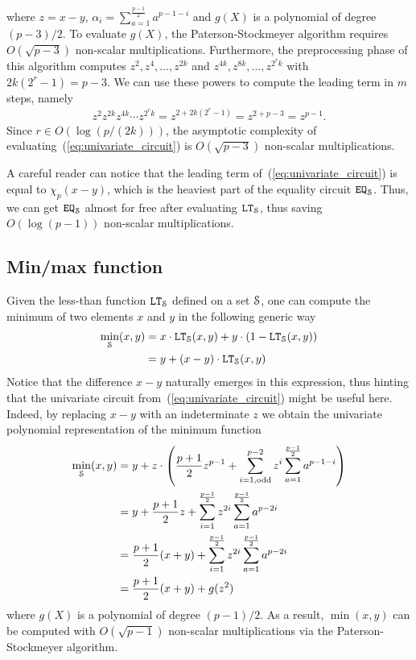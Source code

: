   where $z = x - y$, $\alpha_i = \sum_{a=1}^{\frac{p-1}{2}} a^{p-1-i}$ and $g(X)$ is a polynomial of degree $(p-3)/2$.
  To evaluate $g(X)$, the Paterson-Stockmeyer algorithm requires $O(\sqrt{p-3})$ non-scalar multiplications.
  Furthermore, the preprocessing phase of this algorithm computes $z^2, z^4, \dots, z^{2k}$ and $z^{4k}, z^{8k}, \dots, z^{2^r k}$ with $2k(2^r-1) = p-3$.
  We can use these powers to compute the leading term in $m$ steps, namely
  \begin{align*}
    z^2 z^{2k} z^{4k} \cdots z^{2^r k} = z^{2 + 2k(2^r-1)} = z^{2 + p - 3} = z^{p-1}.
  \end{align*}
  Since $r \in O(\log (p/(2k)))$, the asymptotic complexity of evaluating~(\ref{eq:univariate_circuit}) is $O(\sqrt{p-3})$ non-scalar multiplications.
  
  \begin{remark}
    A careful reader can notice that the leading term of~(\ref{eq:univariate_circuit}) is equal to $\chi_p(x-y)$, which is the heaviest part of the equality circuit $\EQ_\S$.
    Thus, we can get $\EQ_\S$ almost for free after evaluating $\LT_\S$, thus saving $O(\log (p-1))$ non-scalar multiplications.
  \end{remark}

\subsection{Min/max function}

  Given the less-than function $\LT_\S$ defined on a set $\S$, one can compute the minimum of two elements $x$ and $y$ in the following generic way
  \begin{align*}
    \min_\S(x,y) &= x \cdot \LT_\S(x,y) + y \cdot (1 - \LT_\S(x,y)) \\
    &= y + (x-y) \cdot \LT_\S(x,y)
  \end{align*}
  Notice that the difference $x - y$ naturally emerges in this expression, thus hinting that the univariate circuit from~(\ref{eq:univariate_circuit}) might be useful here.
  Indeed, by replacing $x - y$ with an indeterminate $z$ we obtain the univariate polynomial representation of the minimum function 
  \begin{align*}
    \min_\S(x,y) & = y + z \cdot \left(\frac{p+1}{2} z^{p-1} + \sum_{i=1, \text{odd}}^{p-2} z^i \sum_{a=1}^{\frac{p-1}{2}} a^{p-1-i}\right) \\
    & = y + \frac{p+1}{2} z + \sum_{i=1}^{\frac{p-1}{2}} z^{2i} \sum_{a=1}^{\frac{p-1}{2}} a^{p-2i} \\
    & = \frac{p+1}{2} (x+y) + \sum_{i=1}^{\frac{p-1}{2}} z^{2i} \sum_{a=1}^{\frac{p-1}{2}} a^{p-2i} \\
    & = \frac{p+1}{2} (x+y) + g(z^2)
  \end{align*}
  where $g(X)$ is a polynomial of degree $(p-1)/2$. 
  As a result, $\min(x,y)$ can be computed with $O(\sqrt{p-1})$ non-scalar multiplications via the Paterson-Stockmeyer algorithm.

